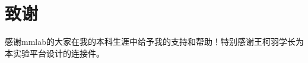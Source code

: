 %
%
\chapter[致谢]{致\quad 谢}%
\pagestyle{mainmatterstyle} %

感谢mmlab的大家在我的本科生涯中给予我的支持和帮助！特别感谢王柯羽学长为本实验平台设计的连接件。

\cleardoublepage[plain]%
